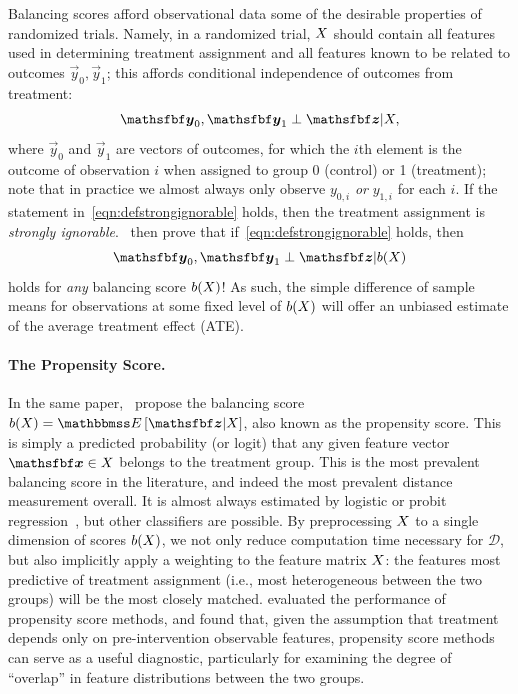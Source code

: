 \documentclass[11pt]{extarticle}
\begin{document}
Balancing scores afford observational data some of the desirable properties of randomized trials. Namely, in a randomized trial, $X$ should contain all features used in determining treatment assignment and all features known to be related to outcomes $\vec{y}_0, \vec{y}_1$; this affords conditional independence of outcomes from treatment:
\begin{equation}
  \vec{y}_0, \vec{y}_1 \perp \vec{z} | \mat{X}, \label{eqn:defstrongignorable}
\end{equation}
where $\vec{y}_0$ and $\vec{y}_1$ are vectors of outcomes, for which the $i$th element is the outcome of observation $i$ when assigned to group 0 (control) or 1 (treatment); note that in practice we almost always only observe $y_{0,i}$ \emph{or} $y_{1,i}$ for each $i$. If the statement in~\eqref{eqn:defstrongignorable} holds, then the treatment assignment is \emph{strongly ignorable}.~\textcite{rosenbaum_central_1983} then prove that if~\eqref{eqn:defstrongignorable} holds, then
\begin{equation}
  \vec{y}_0, \vec{y}_1 \perp \vec{z} | b(\mat{X})
\end{equation}
holds for \emph{any} balancing score $b(X)$! As such, the simple difference of sample means for observations at some fixed level of $b(X)$ will offer an unbiased estimate of the average treatment effect (ATE).

\paragraph{The Propensity Score.} In the same paper,~\textcite{rosenbaum_central_1983} propose the balancing score $b(\mat{X}) = \mathbbmss E \left [\vec{z} | \mat{X}\right ]$, also known as the propensity score.
This is simply a predicted probability (or logit) that any given feature vector $\vec{x} \in \mat{X}$ belongs to the treatment group.
This is the most prevalent balancing score in the literature, and indeed the most prevalent distance measurement overall. It is almost always estimated by logistic or probit regression~\parencite{garrido_methods_2014}, but other classifiers are possible.
By preprocessing $X$ to a single dimension of scores $b(X)$, we not only reduce computation time necessary for $\mathcal{D}$, but also implicitly apply a weighting to the feature matrix $X$: the features most predictive of treatment assignment (i.e., most heterogeneous between the two groups) will be the most closely matched. \cite{dehejia_causal_1999} evaluated the performance of propensity score methods, and found that, given the assumption that treatment depends only on pre-intervention observable features, propensity score methods can serve as a useful diagnostic, particularly for examining the degree of ``overlap'' in feature distributions between the two groups.
\end{document}
